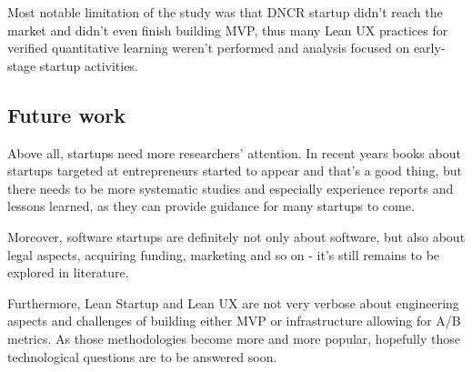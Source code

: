 \documentclass{article}
\begin{document}
Most notable limitation of the study was that DNCR startup didn't reach the market and didn't even finish building MVP, thus many Lean UX practices for verified quantitative learning weren't performed and analysis focused on early-stage startup activities.

\subsection{Future work}
Above all, startups need more researchers' attention. In recent years books about startups targeted at entrepreneurs started to appear and that's a good thing, but there needs to be more systematic studies and especially experience reports and lessons learned, as they can provide guidance for many startups to come.

Moreover, software startups are definitely not only about software, but also about legal aspects, acquiring funding, marketing and so on - it's still remains to be explored in literature.

Furthermore, Lean Startup and Lean UX are not very verbose about engineering aspects and challenges of building either MVP or infrastructure allowing for A/B metrics. As those methodologies become more and more popular, hopefully those technological questions are to be answered soon.

\listoffigures

 
\end{document}
